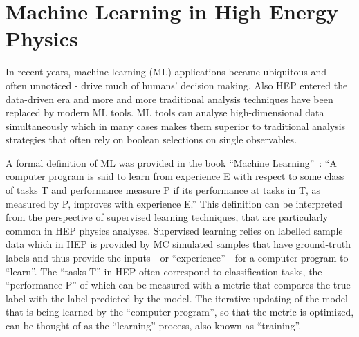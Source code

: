 





\chapter{Machine Learning in High Energy Physics}
\label{chap:ml}

In recent years, machine learning (ML) applications became ubiquitous and - often unnoticed - drive much of humans' decision making. 
Also HEP entered the data-driven era and more and more traditional analysis techniques have been replaced by modern ML tools.
ML tools can analyse high-dimensional data simultaneously which in many cases makes them superior to traditional analysis strategies that often rely on boolean selections on single observables. 

A formal definition of ML was provided in the book ``Machine Learning''~:
``A computer program is said to learn from experience E with respect to some class of tasks T and performance measure P if its performance at tasks in T, as measured by P, improves with experience E.''
This definition can be interpreted from the perspective of supervised learning techniques, that are particularly common in HEP physics analyses. 
Supervised learning relies on labelled sample data which in HEP is provided by MC simulated samples that have ground-truth labels and thus provide the inputs - or ``experience'' - for a computer program to ``learn''.
The ``tasks T'' in HEP often correspond to classification tasks, the ``performance P'' of which can be measured with a metric that compares the true label with the label predicted by the model. 
The iterative updating of the model that is being learned by the ``computer program'', so that the metric is optimized, can be thought of as the ``learning'' process, also known as ``training''. 

